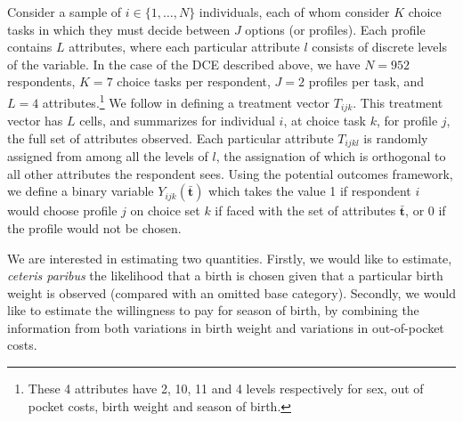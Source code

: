 \documentclass[a4paper, 11pt]{article}
\begin{document}
\begin{spacing}{1.4}
Consider a sample of $i\in \{1,\ldots,N\}$ individuals, each of whom consider
$K$ choice tasks in which they must decide between $J$ options (or profiles).
Each profile contains $L$ attributes, where each particular attribute $l$
consists of discrete levels of the variable.  In the case of the DCE
described above, we have $N=952$ respondents, $K=7$ choice tasks per
respondent, $J=2$ profiles per task, and $L=4$ attributes.\footnote{These
  4 attributes have 2, 10, 11 and 4 levels respectively for sex, out of pocket
  costs, birth weight and season of birth.} We follow
\citet{Hainmuelleretal2013} in defining a treatment vector $T_{ijk}$.
This treatment vector has $L$ cells, and summarizes for individual $i$,
at choice task $k$, for profile $j$, the full set of attributes observed.
Each particular attribute $T_{ijkl}$ is randomly assigned from among all
the levels of $l$, the assignation of which is orthogonal to all other
attributes the respondent sees.  Using the potential outcomes framework,
we define a binary variable $Y_{ijk}(\bar{\mathbf{t}})$ which takes the
value 1 if respondent $i$ would choose profile $j$ on choice set $k$ if
faced with the set of attributes $\bar{\mathbf{t}}$, or 0 if the profile
would not be chosen.

We are interested in estimating two quantities.  Firstly, we would like to
estimate, \emph{ceteris paribus} the likelihood that a birth is chosen given
that a particular birth weight is observed (compared with an omitted base
category).  Secondly, we would like to estimate the willingness to pay for
season of birth, by combining the information from both variations in birth
weight and variations in out-of-pocket costs.


\end{spacing}
\end{document}
